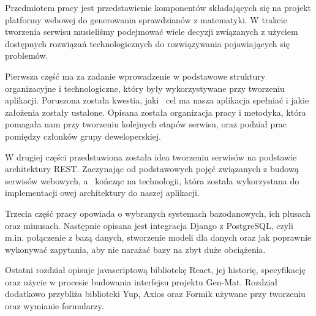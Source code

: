 \documentclass[oneside,polski,logo,indent]{amuthesis}
\date{Poznań, \today{} r.}
\begin{document}
\maketitle
\makestatement

\begin{streszczenie}
Przedmiotem pracy jest przedstawienie komponentów składających się na projekt platformy webowej do generowania sprawdzianów z matematyki. W trakcie tworzenia serwisu musieliśmy podejmować wiele decyzji związanych z użyciem dostępnych rozwiązań technologicznych do rozwiązywania pojawiających się problemów.

Pierwsza część ma za zadanie wprowadzenie w podstawowe struktury organizacyjne i technologiczne, który były wykorzystywane przy tworzeniu aplikacji. Poruszona została kwestia, jaki~ cel ma nasza aplikacja spełniać i jakie założenia zostały ustalone. Opisana została organizacja pracy i metodyka, która pomagała nam przy tworzeniu kolejnych etapów serwisu, oraz podział prac pomiędzy członków grupy deweloperskiej.

W drugiej części przedstawiona została idea tworzeniu serwisów na podstawie architektury REST. Zaczynając od podstawowych pojęć związanych z budową serwisów webowych, a~ kończąc na technologii, która została wykorzystana do implementacji owej architektury do naszej aplikacji.

Trzecia część pracy opowiada o wybranych systemach bazodanowych, ich plusach oraz minusach. Następnie opisana jest integracja Django z PostgreSQL, czyli m.in. połączenie z bazą danych, stworzenie modeli dla danych oraz jak poprawnie wykonywać zapytania, aby nie narażać bazy na zbyt duże obciążenia.

Ostatni rozdział opisuje javascriptową bibliotekę React, jej historię, specyfikację oraz użycie w procesie budowania interfejsu projektu Gen-Mat. Rozdział dodatkowo przybliża biblioteki Yup, Axios oraz Formik używane przy tworzeniu oraz wymianie formularzy.

\end{streszczenie}


\tableofcontents

\end{document}
